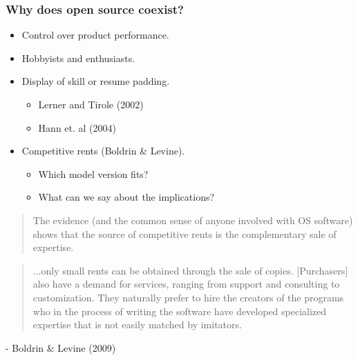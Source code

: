 \documentclass{beamer}
\begin{document}
\begin{frame}[t]
  \frametitle{Why does open source coexist?}
  \begin{itemize}
	\vspace{2mm}
    \item<+-> Control over product performance.
	\vspace{2mm}
    \item<+-> Hobbyists and enthusiasts.
	\vspace{2mm}
    \item<+-> Display of skill or resume padding. %
    \begin{itemize}
		\vspace{2mm}
        \item Lerner and Tirole (2002)
		\vspace{2mm}
        \item Hann et. al (2004)
    \end{itemize}
	\vspace{2mm}
    \item<+-> Competitive rents (Boldrin \& Levine).
    \begin{itemize}
		\vspace{2mm}
        \item<+-> Which model version fits?
		\vspace{2mm}
        \item<+-> What can we say about the implications?
    \end{itemize}
  \end{itemize}
\end{frame}

\begin{frame}[t]
  \begin{quotation}
    The evidence (and the common sense of anyone involved with OS software) shows   that the source of competitive rents is the complementary sale of expertise.
  \end{quotation}
  \begin{quotation}
      ...only small rents can be obtained through the sale of copies. [Purchasers] also have a demand for services, ranging from support and consulting to customization. They naturally prefer to hire the creators of the programs who in the process of writing the software have developed specialized expertise that is not easily matched by imitators.
  \end{quotation}
  - Boldrin \& Levine (2009)
\end{frame}
\end{document}
